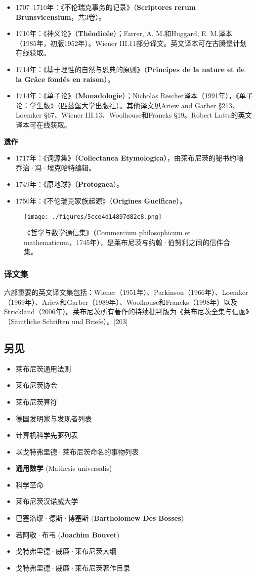 \begin{itemize}
\item 1707–1710年：《不伦瑞克事务的记录》（\textbf{Scriptores rerum Brunsvicensium}，共3卷）。  
\item 1710年：《神义论》（\textbf{Théodicée}）；Farrer, A. M.和Huggard, E. M.译本（1985年，初版1952年）。Wiener III.11部分译文。英文译本可在古腾堡计划在线获取。  
\item 1714年：《基于理性的自然与恩典的原则》（\textbf{Principes de la nature et de la Grâce fondés en raison}）。  
\item 1714年：《单子论》（\textbf{Monadologie}）；Nicholas Rescher译本（1991年），《单子论：学生版》（匹兹堡大学出版社）。其他译文见Ariew and Garber §213、Loemker §67、Wiener III.13、Woolhouse和Francks §19。Robert Latta的英文译本可在线获取。  
\end{itemize}
\textbf{遗作}
\begin{itemize}
\item 1717年：《词源集》（\textbf{Collectanea Etymologica}），由莱布尼茨的秘书约翰·乔治·冯·埃克哈特编辑。  
\item 1749年：《原地球》（\textbf{Protogaea}）。  
\item 1750年：《不伦瑞克家族起源》（\textbf{Origines Guelficae}）。
\end{itemize}
\begin{figure}[ht]
\centering
\texttt{[image: ./figures/5cce4d14897d82c8.png]}
\caption{《哲学与数学通信集》（Commercium philosophicum et mathematicum，1745年），是莱布尼茨与约翰·伯努利之间的信件合集。} \label{fig_LBNC_8}
\end{figure}
\subsubsection{译文集}  
六部重要的英文译文集包括：Wiener（1951年）、Parkinson（1966年）、Loemker（1969年）、Ariew和Garber（1989年）、Woolhouse和Francks（1998年）以及Strickland（2006年）。莱布尼茨所有著作的持续批判版为《莱布尼茨全集与信函》（Sämtliche Schriften und Briefe）。[203]
\subsection{另见}  
\begin{itemize}
\item 莱布尼茨通用法则  
\item 莱布尼茨协会  
\item 莱布尼茨算符  
\item 德国发明家与发现者列表  
\item 计算机科学先驱列表  
\item 以戈特弗里德·莱布尼茨命名的事物列表  
\item \textbf{通用数学} (Mathesis universalis)  
\item 科学革命  
\item 莱布尼茨汉诺威大学  
\item 巴塞洛缪·德斯·博塞斯 (\textbf{Bartholomew Des Bosses})  
\item 若阿敬·布韦 (\textbf{Joachim Bouvet})  
\item 戈特弗里德·威廉·莱布尼茨大纲  
\item 戈特弗里德·威廉·莱布尼茨著作目录  
\end{itemize}
